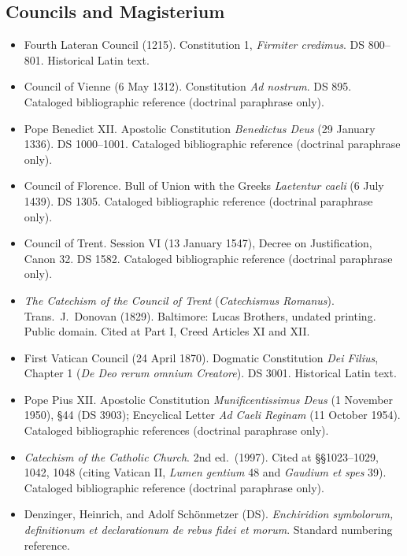 \subsection*{Councils and Magisterium}

\begin{itemize}
\item Fourth Lateran Council (1215). Constitution 1, \textit{Firmiter credimus}. DS 800--801. Historical Latin text.
\item Council of Vienne (6 May 1312). Constitution \textit{Ad nostrum}. DS 895. Cataloged bibliographic reference (doctrinal paraphrase only).
\item Pope Benedict XII. Apostolic Constitution \textit{Benedictus Deus} (29 January 1336). DS 1000--1001. Cataloged bibliographic reference (doctrinal paraphrase only).
\item Council of Florence. Bull of Union with the Greeks \textit{Laetentur caeli} (6 July 1439). DS 1305. Cataloged bibliographic reference (doctrinal paraphrase only).
\item Council of Trent. Session VI (13 January 1547), Decree on Justification, Canon 32. DS 1582. Cataloged bibliographic reference (doctrinal paraphrase only).
\item \textit{The Catechism of the Council of Trent} (\textit{Catechismus Romanus}). Trans.\ J.\ Donovan (1829). Baltimore: Lucas Brothers, undated printing. Public domain. Cited at Part I, Creed Articles XI and XII.
\item First Vatican Council (24 April 1870). Dogmatic Constitution \textit{Dei Filius}, Chapter 1 (\textit{De Deo rerum omnium Creatore}). DS 3001. Historical Latin text.
\item Pope Pius XII. Apostolic Constitution \textit{Munificentissimus Deus} (1 November 1950), \S 44 (DS 3903); Encyclical Letter \textit{Ad Caeli Reginam} (11 October 1954). Cataloged bibliographic references (doctrinal paraphrase only).
\item \textit{Catechism of the Catholic Church}. 2nd ed.\ (1997). Cited at \S\S 1023--1029, 1042, 1048 (citing Vatican II, \textit{Lumen gentium} 48 and \textit{Gaudium et spes} 39). Cataloged bibliographic reference (doctrinal paraphrase only).
\item Denzinger, Heinrich, and Adolf Sch\"{o}nmetzer (DS). \textit{Enchiridion symbolorum, definitionum et declarationum de rebus fidei et morum}. Standard numbering reference.
\end{itemize}

